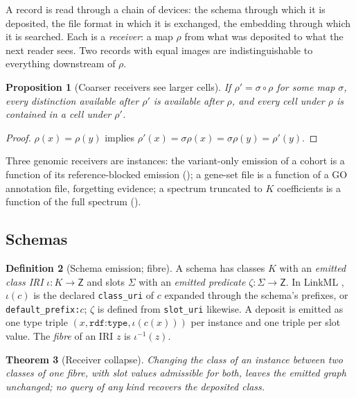\documentclass[11pt,twocolumn,a4paper]{article}
\theoremstyle{plain}
\newtheorem{theorem}{Theorem}[section]
\newtheorem{proposition}[theorem]{Proposition}
\theoremstyle{definition}
\newtheorem{definition}[theorem]{Definition}
\theoremstyle{remark}
\newcommand{\Zset}{\mathsf{Z}}
\newcommand{\rdftype}{\texttt{rdf:type}}
\begin{document}
A record is read through a chain of devices: the schema through which it is
deposited, the file format in which it is exchanged, the embedding through
which it is searched. Each is a \emph{receiver}: a map $\rho$ from what was
deposited to what the next reader sees. Two records with equal images are
indistinguishable to everything downstream of $\rho$.

\begin{proposition}[Coarser receivers see larger cells]
\label{prop:factor}
If $\rho'=\sigma\circ\rho$ for some map $\sigma$, every distinction available
after $\rho'$ is available after $\rho$, and every cell under $\rho$ is
contained in a cell under $\rho'$.
\end{proposition}

\begin{proof}
$\rho(x)=\rho(y)$ implies $\rho'(x)=\sigma\rho(x)=\sigma\rho(y)=\rho'(y)$.
\end{proof}

Three genomic receivers are instances: the variant-only emission of a cohort is
a function of its reference-blocked emission (); a
gene-set file is a function of a GO annotation file, forgetting evidence; a
spectrum truncated to $K$ coefficients is a function of the full spectrum
().

\subsection{Schemas}

\begin{definition}[Schema emission; fibre]
\label{def:schema}
A schema has classes $K$ with an \emph{emitted class IRI} $\iota:K\to\Zset$ and
slots $\Sigma$ with an \emph{emitted predicate} $\zeta:\Sigma\to\Zset$. In
LinkML \citep{moxon2021}, $\iota(c)$ is the declared \texttt{class\_uri} of $c$
expanded through the schema's prefixes, or \texttt{default\_prefix:}$c$; $\zeta$
is defined from \texttt{slot\_uri} likewise. A deposit is emitted as one type
triple $(x,\rdftype,\iota(c(x)))$ per instance and one triple per slot value.
The \emph{fibre} of an IRI $z$ is $\iota^{-1}(z)$.
\end{definition}

\begin{theorem}[Receiver collapse]
\label{thm:collapse}
Changing the class of an instance between two classes of one fibre, with slot
values admissible for both, leaves the emitted graph unchanged; no query of any
kind recovers the deposited class.
\end{theorem}
\end{document}
